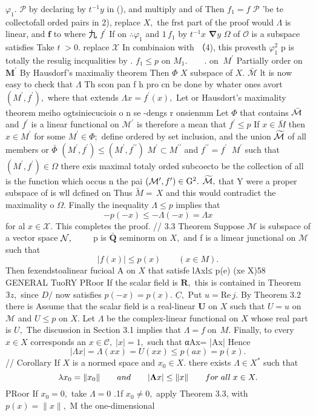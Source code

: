 $\varphi_{1}.$ ${\mathcal{P}}$ by declaring by $t^{-1}y$ in (), and multiply and of Then $f_{1}=f$ ${\mathcal{P}}$ 'be te collectofall orded pairs in 2), replace $X,$ the frst part of the proof would $\Lambda$ is linear, and $\boldsymbol{f}$ to where 九 $f^{\prime}$ If on $\therefore\varphi_{1}$ and $1\,f_{1}$ by $t^{-1}x$ $\mathbf{\nabla}y$ $\Omega$ of ${\mathcal{O}}$ is a subspace satisfies Take $\scriptstyle t\;>0.$ replace $\textstyle{\mathcal{X}}$ In combinaion with （4), this provesth $\varphi_{1}^{2}$ p is totally the resulig incqualities by . $f_{1}\leq p$ on $M_{1}.\qquad.$ on $\ M^{\prime}$ Partially order on ${\boldsymbol{M}}^{\prime}$ By Hausdorf's maximaliy theorem Then $\Phi$ $X$ subspace of $X.$ $\bar{\mathcal{M}}$ lt is now easy to check that $\Lambda$ Th scon pan f h pro cn be done by whater ones avort $(M^{\prime},f^{\prime}),$ where that extends $\Lambda x=f^{\prime}(x),$ Let or Hausdort's maximality theorem meiho ogtsiniecuciois o n se -dengs r onsienmm Let $\Phi$ that contains $\bar{\cal M}$ and $f^{\prime}$ is a linear functional on ${\mathcal{M}}^{\prime}$ is therefore a mean that $f^{\prime}\leq p$ If $x\in{\bar{M}}$ then $x\in M^{\prime}$ for some $M^{\prime}\in\Phi;$ define ordered by set inclusion, and the union $\widetilde{\cal M}$ of all members or $\bar{\Phi}$ $(M^{\prime},f^{\prime})\leq(M^{\prime},f^{\prime\prime})$ $M^{\prime}\subset M^{\prime\prime}$ and $f^{\prime\prime}=f^{\prime}$ $\ M^{\prime}$ such that $(M^{\prime},f^{\prime})\in\Omega$ there exis maximal totaly orded subcoecto be the collection of all is the function which occus n the pai $({\cal M}^{\prime},f^{\prime})\in\mathrm{G}^{2}.$ ${\widetilde{\cal M}},$ that Y were a proper subspace of is wll dcfined on Thus ${\tilde{M}}=\,X$ and this would contradict the maximality o $\Omega.$ Finally the inequality $\Lambda\leq p$ implies that $$ -p(-x)\leq-\Lambda(-x)=\Lambda x $$ for al $x\in{\mathcal{X}}.$ This completes the proof. // 3.3 Theorem Suppose $\mathcal{M}$ is subspace of a vector space ${\cal{N}},{\qquad}$ p is $\bar{\boldsymbol{Q}}$ seminorm on $X,$ and f is a limear junctional on $\mathcal{M}$ such that $$ \vert f(x)\vert\leq p(x)\qquad(x\in M). $$ Then fexendstoalinear fucioal A on $X$ that satisfe lAxl≤ p(e) (xe X)58 GENERAL TuoRY PRoor If the scalar field is ${\boldsymbol{R}},$ this is contained in Theorem $\mathbb{3}z,$ since $D\!\!\!\!/$ now satisfies $p(-x)=p(x).$ ${\underline{{C}}},$ Put $u=\mathrm{{Re}}\,j.$ By Theorem 3.2 there is Assume that the scalar field is a real-linear ${\boldsymbol{U}}$ on $X$ such that $U=u$ on $\mathcal{M}$ and $U\leq p$ on $X.$ Let $\Lambda$ be the complex-linear functional on $\textstyle X$ whose real part is $U,$ The discussion in Section 3.1 implies that $\Lambda=f\operatorname{on}\,M.$ Finally, to cvery $x\in X$ corresponds an $x\in{\mathcal{C}},\;|x|=1,$ such that αAx= |Ax| Hence $$ \vert\Lambda x\vert=\Lambda(x x)=U(x x)\le p(a x)=p(x). $$ // Corollary If $\textstyle X$ is a normed space and $x_{0}\in X.$ there exists $\Lambda\in X^{*}$ such that $$ {\bf\lambda}{x}_{0}=\|x_{0}\|\qquad a n d\qquad|{\bf\Lambda}{x}|\leq\|x\|\qquad f o r\;a l l\;{x}\in X. $$ PRoor If $x_{0}=0,$ take $\Lambda=0$ .1f $x_{0}\neq0,$ apply Theorem 3.3, with $p(x)=\|x\|,$ M the one-dimensional 